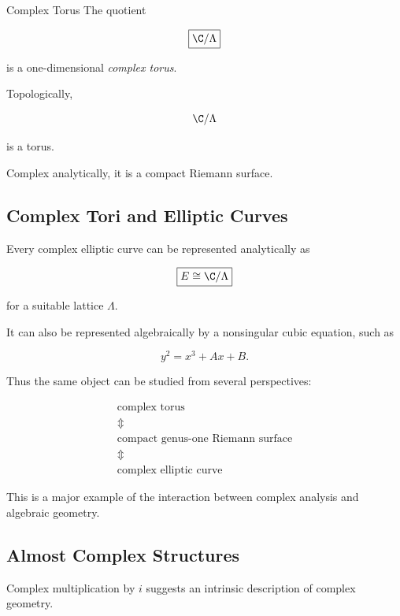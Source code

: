 \begin{definitionbox}{Complex Torus}
The quotient

\[
\boxed{
\C/\Lambda
}
\]

is a one-dimensional \emph{complex torus}.
\end{definitionbox}

Topologically,

\[
\C/\Lambda
\]

is a torus.

Complex analytically, it is a compact Riemann surface.

\subsection{Complex Tori and Elliptic Curves}
\label{subsec:complex-tori-elliptic-curves}

Every complex elliptic curve can be represented analytically as

\[
\boxed{
E\cong\C/\Lambda
}
\]

for a suitable lattice \(\Lambda\).

It can also be represented algebraically by a nonsingular cubic equation,
such as

\[
\boxed{
y^2=x^3+Ax+B.
}
\]

Thus the same object can be studied from several perspectives:

\[
\boxed{
\begin{array}{c}
\text{complex torus}\\
\Updownarrow\\
\text{compact genus-one Riemann surface}\\
\Updownarrow\\
\text{complex elliptic curve}
\end{array}
}
\]

This is a major example of the interaction between complex analysis and
algebraic geometry.

\subsection{Almost Complex Structures}
\label{subsec:almost-complex-structures}

Complex multiplication by \(i\) suggests an intrinsic description of complex
geometry.

